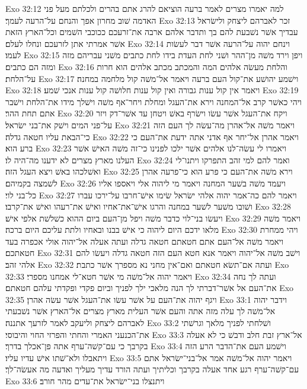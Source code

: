 Exo 32:12  למה יאמרו מצרים לאמר ברעה הוציאם להרג אתם בהרים ולכלתם מעל פני האדמה שׁוב מחרון אפך והנחם על־הרעה לעמך׃
Exo 32:13  זכר לאברהם ליצחק ולישׂראל עבדיך אשׁר נשׁבעת להם בך ותדבר אלהם ארבה את־זרעכם ככוכבי השׁמים וכל־הארץ הזאת אשׁר אמרתי אתן לזרעכם ונחלו לעלם׃
Exo 32:14  וינחם יהוה על־הרעה אשׁר דבר לעשׂות לעמו׃
Exo 32:15  ויפן וירד משׁה מן־ההר ושׁני לחת העדת בידו לחת כתבים משׁני עבריהם מזה ומזה הם כתבים׃
Exo 32:16  והלחת מעשׂה אלהים המה והמכתב מכתב אלהים הוא חרות על־הלחת׃
Exo 32:17  וישׁמע יהושׁע את־קול העם ברעה ויאמר אל־משׁה קול מלחמה במחנה׃
Exo 32:18  ויאמר אין קול ענות גבורה ואין קול ענות חלושׁה קול ענות אנכי שׁמע׃
Exo 32:19  ויהי כאשׁר קרב אל־המחנה וירא את־העגל ומחלת ויחר־אף משׁה וישׁלך מידו את־הלחת וישׁבר אתם תחת ההר׃
Exo 32:20  ויקח את־העגל אשׁר עשׂו וישׂרף באשׁ ויטחן עד אשׁר־דק ויזר על־פני המים וישׁק את־בני ישׂראל׃
Exo 32:21  ויאמר משׁה אל־אהרן מה־עשׂה לך העם הזה כי־הבאת עליו חטאה גדלה׃
Exo 32:22  ויאמר אהרן אל־יחר אף אדני אתה ידעת את־העם כי ברע הוא׃
Exo 32:23  ויאמרו לי עשׂה־לנו אלהים אשׁר ילכו לפנינו כי־זה משׁה האישׁ אשׁר העלנו מארץ מצרים לא ידענו מה־היה לו׃
Exo 32:24  ואמר להם למי זהב התפרקו ויתנו־לי ואשׁלכהו באשׁ ויצא העגל הזה׃
Exo 32:25  וירא משׁה את־העם כי פרע הוא כי־פרעה אהרן לשׁמצה בקמיהם׃
Exo 32:26  ויעמד משׁה בשׁער המחנה ויאמר מי ליהוה אלי ויאספו אליו כל־בני לוי׃
Exo 32:27  ויאמר להם כה־אמר יהוה אלהי ישׂראל שׂימו אישׁ־חרבו על־ירכו עברו ושׁובו משׁער לשׁער במחנה והרגו אישׁ־את־אחיו ואישׁ את־רעהו ואישׁ את־קרבו׃
Exo 32:28  ויעשׂו בני־לוי כדבר משׁה ויפל מן־העם ביום ההוא כשׁלשׁת אלפי אישׁ׃
Exo 32:29  ויאמר משׁה מלאו ידכם היום ליהוה כי אישׁ בבנו ובאחיו ולתת עליכם היום ברכה׃
Exo 32:30  ויהי ממחרת ויאמר משׁה אל־העם אתם חטאתם חטאה גדלה ועתה אעלה אל־יהוה אולי אכפרה בעד חטאתכם׃
Exo 32:31  וישׁב משׁה אל־יהוה ויאמר אנא חטא העם הזה חטאה גדלה ויעשׂו להם אלהי זהב׃
Exo 32:32  ועתה אם־תשׂא חטאתם ואם־אין מחני נא מספרך אשׁר כתבת׃
Exo 32:33  ויאמר יהוה אל־משׁה מי אשׁר חטא־לי אמחנו מספרי׃
Exo 32:34  ועתה לך נחה את־העם אל אשׁר־דברתי לך הנה מלאכי ילך לפניך וביום פקדי ופקדתי עלהם חטאתם׃
Exo 32:35  ויגף יהוה את־העם על אשׁר עשׂו את־העגל אשׁר עשׂה אהרן׃
Exo 33:1  וידבר יהוה אל־משׁה לך עלה מזה אתה והעם אשׁר העלית מארץ מצרים אל־הארץ אשׁר נשׁבעתי לאברהם ליצחק וליעקב לאמר לזרעך אתננה׃
Exo 33:2  ושׁלחתי לפניך מלאך וגרשׁתי את־הכנעני האמרי והחתי והפרזי החוי והיבוסי׃
Exo 33:3  אל־ארץ זבת חלב ודבשׁ כי לא אעלה בקרבך כי עם־קשׁה־ערף אתה פן־אכלך בדרך׃
Exo 33:4  וישׁמע העם את־הדבר הרע הזה ויתאבלו ולא־שׁתו אישׁ עדיו עליו׃
Exo 33:5  ויאמר יהוה אל־משׁה אמר אל־בני־ישׂראל אתם עם־קשׁה־ערף רגע אחד אעלה בקרבך וכליתיך ועתה הורד עדיך מעליך ואדעה מה אעשׂה־לך׃
Exo 33:6  ויתנצלו בני־ישׂראל את־עדים מהר חורב׃

